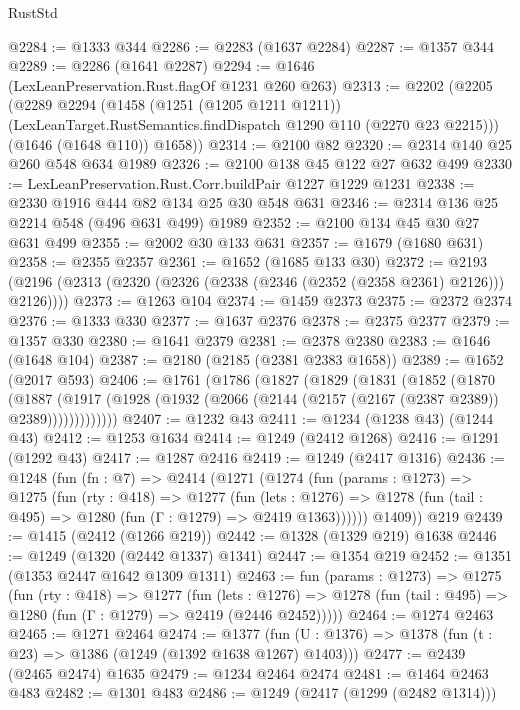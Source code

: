 \begin{lexlean}{RustStd}
\begin{coremodule}
{\begin{coremodule}
{{{{{{{{{{{@2284 := @1333 @344
@2286 := @2283 (@1637 @2284)
@2287 := @1357 @344
@2289 := @2286 (@1641 @2287)
@2294 := @1646 (LexLeanPreservation.Rust.flagOf @1231 @260 @263)
@2313 := @2202
    (@2205
      (@2289
        @2294
        (@1458
          (@1251 (@1205 @1211 @1211))
          (LexLeanTarget.RustSemantics.findDispatch @1290 @110 (@2270 @23 @2215)))
        (@1646 (@1648 @110))
        @1658))
@2314 := @2100 @82
@2320 := @2314 @140 @25 @260 @548 @634 @1989
@2326 := @2100 @138 @45 @122 @27 @632 @499
@2330 := LexLeanPreservation.Rust.Corr.buildPair @1227 @1229 @1231
@2338 := @2330 @1916 @444 @82 @134 @25 @30 @548 @631
@2346 := @2314 @136 @25 @2214 @548 (@496 @631 @499) @1989
@2352 := @2100 @134 @45 @30 @27 @631 @499
@2355 := @2002 @30 @133 @631
@2357 := @1679 (@1680 @631)
@2358 := @2355 @2357
@2361 := @1652 (@1685 @133 @30)
@2372 := @2193 (@2196 (@2313 (@2320 (@2326 (@2338 (@2346 (@2352 (@2358 @2361) @2126))) @2126))))
@2373 := @1263 @104
@2374 := @1459 @2373
@2375 := @2372 @2374
@2376 := @1333 @330
@2377 := @1637 @2376
@2378 := @2375 @2377
@2379 := @1357 @330
@2380 := @1641 @2379
@2381 := @2378 @2380
@2383 := @1646 (@1648 @104)
@2387 := @2180 (@2185 (@2381 @2383 @1658))
@2389 := @1652 (@2017 @593)
@2406 := @1761
    (@1786
      (@1827
        (@1829
          (@1831
            (@1852
              (@1870
                (@1887
                  (@1917 (@1928 (@1932 (@2066 (@2144 (@2157 (@2167 (@2387 @2389)) @2389)))))))))))))
@2407 := @1232 @43
@2411 := @1234 (@1238 @43) (@1244 @43)
@2412 := @1253 @1634
@2414 := @1249 (@2412 @1268)
@2416 := @1291 (@1292 @43)
@2417 := @1287 @2416
@2419 := @1249 (@2417 @1316)
@2436 := @1248
    (fun (fn : @7) =>
    @2414
      (@1271
        (@1274
          (fun (params : @1273) =>
          @1275
            (fun (rty : @418) =>
            @1277
              (fun (lets : @1276) =>
              @1278 (fun (tail : @495) => @1280 (fun (Γ : @1279) => @2419 @1363))))))
        @1409))
    @219
@2439 := @1415 (@2412 (@1266 @219))
@2442 := @1328 (@1329 @219) @1638
@2446 := @1249 (@1320 (@2442 @1337) @1341)
@2447 := @1354 @219
@2452 := @1351 (@1353 @2447 @1642 @1309 @1311)
@2463 := fun (params : @1273) =>
  @1275
    (fun (rty : @418) =>
    @1277
      (fun (lets : @1276) =>
      @1278 (fun (tail : @495) => @1280 (fun (Γ : @1279) => @2419 (@2446 @2452)))))
@2464 := @1274 @2463
@2465 := @1271 @2464
@2474 := @1377 (fun (U : @1376) => @1378 (fun (t : @23) => @1386 (@1249 (@1392 @1638 @1267) @1403)))
@2477 := @2439 (@2465 @2474) @1635
@2479 := @1234 @2464 @2474
@2481 := @1464 @2463 @483
@2482 := @1301 @483
@2486 := @1249 (@2417 (@1299 (@2482 @1314)))
}}}}}}}}}}}
\end{coremodule}}
\end{coremodule}
\end{lexlean}
